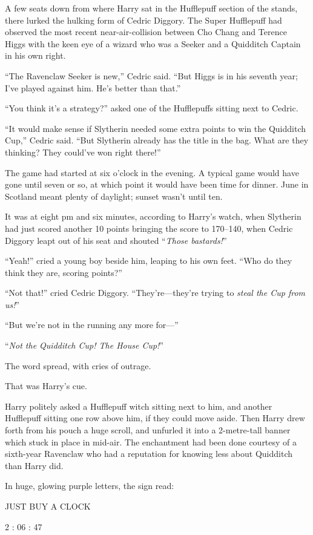 A few seats down from where Harry sat in the Hufflepuff section of the stands, there lurked the hulking form of Cedric Diggory. The Super Hufflepuff had observed the most recent near-air-collision between Cho Chang and Terence Higgs with the keen eye of a wizard who was a Seeker and a Quidditch Captain in his own right.

“The Ravenclaw Seeker is new,” Cedric said.
“But Higgs is in his seventh year; I’ve played against him. He’s better than that.”

“You think it’s a strategy?” asked one of the Hufflepuffs sitting next to Cedric.

“It would make sense if Slytherin needed some extra points to win the Quidditch Cup,” Cedric said.
“But Slytherin already has the title in the bag. What are they thinking? They could’ve won right there!”

The game had started at six o’clock in the evening. A typical game would have gone until seven or so, at which point it would have been time for dinner. June in Scotland meant plenty of daylight; sunset wasn’t until ten.

It was at eight pm and six minutes, according to Harry’s watch, when Slytherin had just scored another 10 points bringing the score to 170–{140}, when Cedric Diggory leapt out of his seat and shouted “\emph{Those bastards!}”

“Yeah!” cried a young boy beside him, leaping to his own feet.
“Who do they think they are, scoring points?”

“Not that!” cried Cedric Diggory.
“They’re—they’re trying to \emph{steal the Cup from us!}”

“But we’re not in the running any more for—”

“\emph{Not the Quidditch Cup! The House Cup!}”

The word spread, with cries of outrage.

That was Harry’s cue.

Harry politely asked a Hufflepuff witch sitting next to him, and another Hufflepuff sitting one row above him, if they could move aside. Then Harry drew forth from his pouch a huge scroll, and unfurled it into a 2-metre-tall banner which stuck in place in mid-air. The enchantment had been done courtesy of a sixth-year Ravenclaw who had a reputation for knowing less about Quidditch than Harry did.

In huge, glowing purple letters, the sign read:

\begin{center}
JUST BUY A CLOCK

2 : 06 : 47
\end{center}


